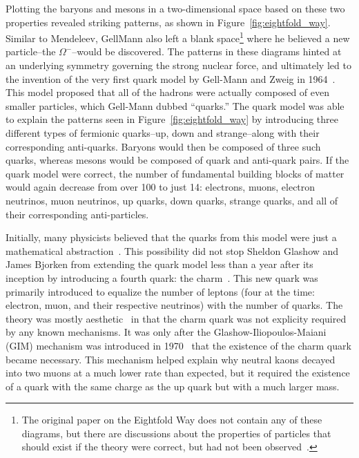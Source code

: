 Plotting the baryons and mesons in a two-dimensional space based on these two properties revealed striking patterns, as shown in Figure~\ref{fig:eightfold_way}. Similar to Mendeleev, GellMann also left a blank space\footnote{The original paper on the Eightfold Way does not contain any of these diagrams, but there are discussions about the properties of particles that should exist if the theory were correct, but had not been observed~\cite{GellMannEightfold}.} where he believed a new particle--the $\Omega^{-}$--would be discovered.  The patterns in these diagrams hinted at an underlying symmetry governing the strong nuclear force, and ultimately led to the invention of the very first quark model by Gell-Mann and Zweig in 1964~\cite{QuarkModel}. This model proposed that all of the hadrons were actually composed of even smaller particles, which Gell-Mann dubbed ``quarks.'' The quark model was able to explain the patterns seen in Figure~\ref{fig:eightfold_way} by introducing three different types of fermionic quarks--up, down and strange--along with their corresponding anti-quarks. Baryons would then be composed of three such quarks, whereas mesons would be composed of quark and anti-quark pairs. If the quark model were correct, the number of fundamental building blocks of matter would again decrease from over 100 to just 14: electrons, muons, electron neutrinos, muon neutrinos, up quarks, down quarks, strange quarks, and all of their corresponding anti-particles.

Initially, many physicists believed that the quarks from this model were just a mathematical abstraction~\cite{QuarkAbstraction}. This possibility did not stop Sheldon Glashow and James Bjorken from extending the quark model less than a year after its inception by introducing a fourth quark: the charm~\cite{CharmQuark}. This new quark was primarily introduced to equalize the number of leptons (four at the time: electron, muon, and their respective neutrinos) with the number of quarks. The theory was mostly aesthetic~\cite{AestheticCharm} in that the charm quark was not explicity required by any known mechanisms. It was only after the Glashow-Iliopoulos-Maiani (GIM) mechanism was introduced in 1970~\cite{GIM} that the existence of the charm quark became necessary. This mechanism helped explain why neutral kaons decayed into two muons at a much lower rate than expected, but it required the existence of a quark with the same charge as the up quark but with a much larger mass.


